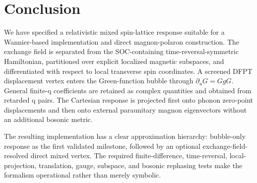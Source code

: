 \section{Conclusion}
\label{sec:conclusion}

We have specified a relativistic mixed spin-lattice response suitable for a Wannier-based implementation and direct magnon-polaron construction. The exchange field is separated from the SOC-containing time-reversal-symmetric Hamiltonian, partitioned over explicit localized magnetic subspaces, and differentiated with respect to local transverse spin coordinates. A screened DFPT displacement vertex enters the Green-function bubble through $\partial_uG=GgG$. General finite-q coefficients are retained as complex quantities and obtained from retarded q pairs. The Cartesian response is projected first onto phonon zero-point displacements and then onto external paraunitary magnon eigenvectors without an additional bosonic metric.

The resulting implementation has a clear approximation hierarchy: bubble-only response as the first validated milestone, followed by an optional exchange-field-resolved direct mixed vertex. The required finite-difference, time-reversal, local-projection, translation, gauge, subspace, and bosonic rephasing tests make the formalism operational rather than merely symbolic.
